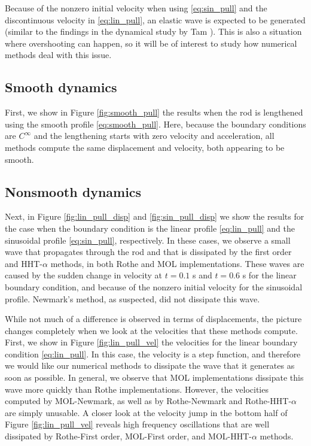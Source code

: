 \documentclass{sfuthesis}
\numberwithin{equation}{section}
\numberwithin{figure}{chapter}
\numberwithin{table}{chapter}
\theoremstyle{definition}
\begin{document}
Because of the nonzero initial velocity when using \eqref{eq:sin_pull} and the discontinuous velocity in \eqref{eq:lin_pull}, an elastic wave is expected to be generated (similar to the findings in the dynamical study by Tam \cite{Cassidy}). This is also a situation where overshooting can happen, so it will be of interest to study how numerical methods deal with this issue.

\subsection*{Smooth dynamics}

First, we show in Figure \ref{fig:smooth_pull} the results when the rod is lengthened using the smooth profile \eqref{eq:smooth_pull}. Here, because the boundary conditions are $C^\infty$ and the lengthening starts with zero velocity and acceleration, all methods compute the same displacement and velocity, both appearing to be smooth.

\subsection*{Nonsmooth dynamics}

Next, in Figure \ref{fig:lin_pull_disp} and \ref{fig:sin_pull_disp} we show the results for the case when the boundary condition is the linear profile \eqref{eq:lin_pull} and the sinusoidal profile \eqref{eq:sin_pull}, respectively. In these cases, we observe a small wave that propagates through the rod and that is dissipated by the first order and HHT-$\alpha$ methods, in both Rothe and MOL implementations. These waves are caused by the sudden change in velocity at $t = 0.1$ s and $t = 0.6$ s for the linear boundary condition, and because of the nonzero initial velocity for the sinusoidal profile. Newmark's method, as suspected, did not dissipate this wave. 

While not much of a difference is observed in terms of displacements, the picture changes completely when we look at the velocities that these methods compute. First, we show in Figure \ref{fig:lin_pull_vel} the velocities for the linear boundary condition \eqref{eq:lin_pull}. In this case, the velocity is a step function, and therefore we would like our numerical methods to dissipate the wave that it generates as soon as possible. In general, we observe that MOL implementations dissipate this wave more quickly than Rothe implementations. However, the velocities computed by MOL-Newmark, as well as by Rothe-Newmark and Rothe-HHT-$\alpha$ are simply unusable. A closer look at the velocity jump in the bottom half of Figure \ref{fig:lin_pull_vel} reveals high frequency oscillations that are well dissipated by Rothe-First order, MOL-First order, and MOL-HHT-$\alpha$ methods. 
\end{document}
